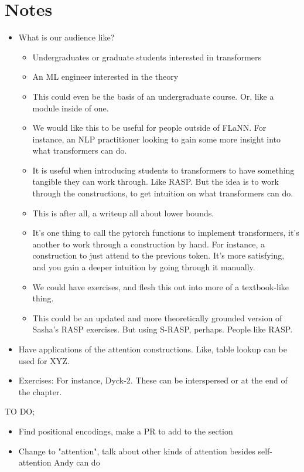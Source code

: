 \documentclass{article}
\begin{document}
\section{Notes}
\begin{itemize}
    \item What is our audience like?
        \begin{itemize}
            \item Undergraduates or graduate students interested in transformers
            \item An ML engineer interested in the theory
            \item This could even be the basis of an undergraduate course. Or, like a module inside of one.
            \item We would like this to be useful for people outside of FLaNN. For instance, an NLP practitioner looking to gain some more insight into what transformers can do.
            \item It is useful when introducing students to transformers to have something tangible they can work through. Like RASP. But the idea is to work through the constructions, to get intuition on what transformers can do.
            \item This is after all, a writeup all about lower bounds.
            \item It's one thing to call the pytorch functions to implement transformers, it's another to work through a construction by hand. For instance, a construction to just attend to the previous token. It's more satisfying, and you gain a deeper intuition by going through it manually.
            \item We could have exercises, and flesh this out into more of a textbook-like thing.
            \item This could be an updated and more theoretically grounded version of Sasha's RASP exercises. But using S-RASP, perhaps. People like RASP.
        \end{itemize}
    \item Have applications of the attention constructions. Like, table lookup can be used for XYZ.
    \item Exercises: For instance, Dyck-2. These can be interspersed or at the end of the chapter.
\end{itemize}

TO DO;
\begin{itemize}
    \item Find positional encodings, make a PR to add to the section
    \item Change to "attention", talk about other kinds of attention besides self-attention Andy can do
\end{itemize}



\end{document}
